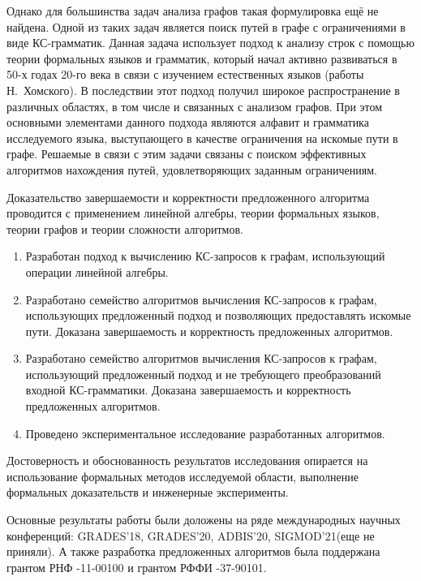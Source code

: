 Однако для большинства задач анализа графов такая формулировка ещё не найдена. Одной из таких задач является поиск путей в графе с ограничениями в виде КС-грамматик. Данная задача использует подход к анализу строк с помощью теории формальных языков и грамматик, который начал активно развиваться в 50-х годах 20-го века в связи с изучением естественных языков (работы Н.~Хомского). В последствии этот подход получил широкое распространение в различных областях, в том числе и связанных с анализом графов.
При этом основными элементами данного подхода являются алфавит и грамматика исследуемого языка, выступающего в качестве ограничения на искомые пути в графе. Решаемые в связи с этим задачи связаны с поиском эффективных алгоритмов нахождения путей, удовлетворяющих заданным ограничениям.

Доказательство завершаемости и корректности предложенного алгоритма проводится с применением линейной алгебры, теории формальных языков, теории графов и теории сложности алгоритмов.

{}
\begin{enumerate}[beginpenalty=10000] %
	\item Разработан подход к вычислению КС-запросов к графам, использующий операции линейной алгебры.
	\item Разработано семейство алгоритмов вычисления КС-запросов к графам, использующих предложенный подход и позволяющих предоставлять искомые пути. Доказана завершаемость и корректность предложенных алгоритмов.
	\item Разработано семейство алгоритмов вычисления КС-запросов к графам, использующий предложенный подход и не требующего преобразований входной КС-грамматики. Доказана завершаемость и корректность предложенных алгоритмов.
	\item Проведено экспериментальное исследование разработанных алгоритмов.
\end{enumerate}

{\reliability} 
Достоверность и обоснованность результатов исследования опирается на использование формальных методов исследуемой области, выполнение формальных доказательств и инженерные эксперименты.

Основные результаты работы были доложены на ряде международных научных конференций: GRADES'18, GRADES'20, ADBIS’20, SIGMOD'21(еще не приняли). А также разработка предложенных алгоритмов была поддержана грантом РНФ -11-00100 и грантом РФФИ -37-90101.

